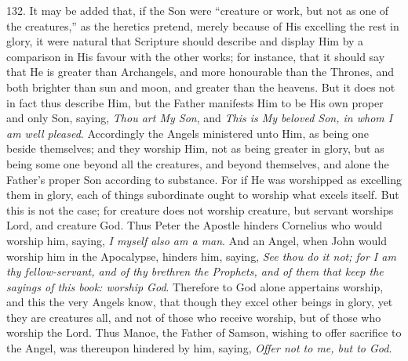 132. It may be added that, if
the Son were ``creature or work, but not as one of the creatures,'' as
the heretics pretend, merely because of His excelling the rest in
glory, it were natural that Scripture should describe and display Him
by a comparison in His favour with the other works; for instance, that
it should say that He is greater than Archangels, and more honourable
than the Thrones, and both brighter than sun and moon, and greater
than the heavens. But it does not in fact thus describe Him, but the
Father manifests Him to be His own proper and only Son, saying, \emph{Thou
art My Son}, and \emph{This is My beloved Son, in whom I am well
pleased}. Accordingly the Angels ministered unto Him, as being one
beside themselves; and they worship Him, not as being greater in
glory, but as being some one beyond all the creatures, and beyond
themselves, and alone the Father's proper Son according to substance.
For if He was worshipped as excelling them in glory, each of things
subordinate ought to worship what excels itself. But this is not the
case; for creature does not worship creature, but servant worships
Lord, and creature God. Thus Peter the Apostle hinders Cornelius who
would worship him, saying, \emph{I myself also am a man}. And an
Angel, when John would worship him in the Apocalypse, hinders him,
saying, \emph{See thou do it not; for I am thy fellow-servant, and of thy
brethren the Prophets, and of them that keep the sayings of this book:
worship God}. Therefore to God alone appertains worship, and
this the very Angels know, that though they excel other beings in
glory, yet they are creatures all, and not of those who receive
worship, but of those who worship the Lord. Thus Manoe, the Father of
Samson, wishing to offer sacrifice to the Angel, was thereupon
hindered by him, saying, \emph{Offer not to me, but to God}.

